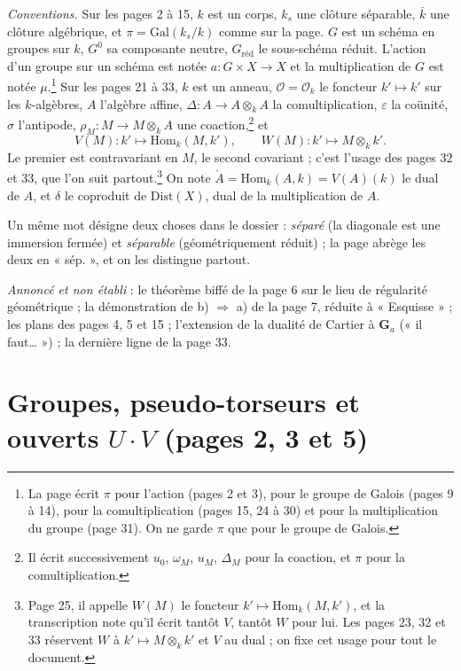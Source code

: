 \documentclass[11pt,a4paper]{article}
\begin{document}
\emph{Conventions.} Sur les pages 2 à 15, $k$ est un corps, $k_{s}$ une
clôture séparable, $\bar k$ une clôture algébrique, et
$\pi = \mathrm{Gal}(k_{s}/k)$ comme sur la page. $G$ est un schéma en groupes
sur $k$, $G^{0}$ sa composante neutre, $G_{\mathrm{réd}}$ le sous-schéma
réduit. L'action d'un groupe sur un schéma est notée
$a \colon G \times X \to X$ et la multiplication de $G$ est notée
$\mu$.\footnote{La page écrit $\pi$ pour l'action (pages 2 et 3), pour le
groupe de Galois (pages 9 à 14), pour la comultiplication (pages 15, 24 à 30)
et pour la multiplication du groupe (page 31). On ne garde $\pi$ que pour le
groupe de Galois.}
Sur les pages 21 à 33, $k$ est un anneau, $\mathcal{O} = \mathcal{O}_{k}$ le
foncteur $k' \mapsto k'$ sur les $k$-algèbres, $A$ l'algèbre affine,
$\Delta \colon A \to A \otimes_{k} A$ la comultiplication, $\varepsilon$ la
coünité, $\sigma$ l'antipode, $\rho_{M} \colon M \to M \otimes_{k} A$ une
coaction,\footnote{Il écrit successivement $u_{0}$, $\omega_{M}$, $u_{M}$,
$\Delta_{M}$ pour la coaction, et $\pi$ pour la comultiplication.} et
\[
  V(M) \colon k' \longmapsto \mathrm{Hom}_{k}(M, k'), \qquad
  W(M) \colon k' \longmapsto M \otimes_{k} k' .
\]
Le premier est contravariant en $M$, le second covariant ; c'est l'usage
des pages 32 et 33, que l'on suit partout.\footnote{Page 25, il appelle
$W(M)$ le foncteur $k' \mapsto \mathrm{Hom}_{k}(M, k')$, et la transcription
note qu'il écrit tantôt $V$, tantôt $W$ pour lui. Les pages 23, 32 et 33
réservent $W$ à $k' \mapsto M \otimes_{k} k'$ et $V$ au dual ; on fixe cet
usage pour tout le document.}
On note $\check{A} = \mathrm{Hom}_{k}(A, k) = V(A)(k)$ le dual de $A$, et
$\delta$ le coproduit de $\mathrm{Dist}(X)$, dual de la multiplication de $A$.

Un même mot désigne deux choses dans le dossier : \emph{séparé} (la
diagonale est une immersion fermée) et \emph{séparable} (géométriquement
réduit) ; la page abrège les deux en « sép. », et on les distingue partout.

\emph{Annoncé et non établi} : le théorème biffé de la page 6 sur le lieu de
régularité géométrique ; la démonstration de b) $\Rightarrow$ a) de la page 7,
réduite à « Esquisse » ; les plans des pages 4, 5 et 15 ; l'extension de la
dualité de Cartier à $\mathbf{G}_{a}$ (« il faut… ») ; la dernière ligne de
la page 33.

\section*{Groupes, pseudo-torseurs et ouverts $U \cdot V$ (pages 2, 3 et 5)}
\end{document}
